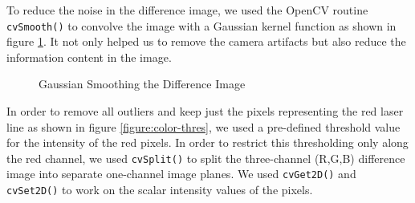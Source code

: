 To reduce the noise in the difference image, we used the OpenCV
routine \texttt{cvSmooth()} to convolve the image with a Gaussian kernel
function as shown in figure \ref{figure:gauss}. It not only helped us to
remove the camera artifacts but also reduce the information content in the
image.

\begin{figure}[ht!]
\centering
{} \quad
{} \hfill
\caption{Gaussian Smoothing the Difference Image}
\label{figure:gauss}
\end{figure}

In order to remove all outliers and keep just the pixels
representing the red laser line as shown in figure \ref{figure:color-thres},
we used a pre-defined threshold value for the intensity of the red pixels. In
order to restrict this thresholding only along the red channel, we used
\texttt{cvSplit()} to split the three-channel (R,G,B) difference image into
separate one-channel image planes. We used \texttt{cvGet2D()} and
\texttt{cvSet2D()} to work on the scalar intensity values of the pixels.

